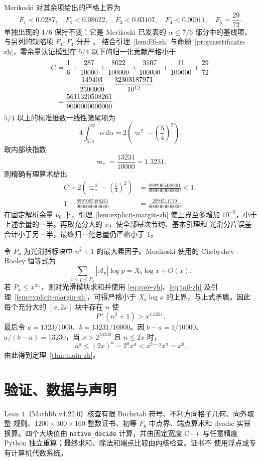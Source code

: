 \documentclass[UTF8,10pt,a4paper]{ctexart}
\newcommand{\Pplus}{P^{+}}
\newcommand{\Acal}{\mathcal{A}}
\newcommand{\1}{\mathbf{1}}
\theoremstyle{remark}
\begin{document}
Merikoski 对其余项给出的严格上界为
\[
 F_1<0.0287,\quad F_2<0.08622,\quad F_3<0.03107,\quad
 F_4<0.00011,\quad F_5=\frac{29}{72}.
\]
单独出现的 $1/6$ 保持不变：它是 Merikoski 已发表的
$\alpha\le7/6$ 部分中的基线项，与另列的缺陷项 $F_1$--$F_4$ 分开
\cite[Section 2.6，定理 2 的证明]{Merikoski2020}。
结合引理~\ref{lem:F6-zh} 与命题~\ref{prop:certificate-zh}，零余量认证模型在
$5/4$ 以下的归一化贡献严格小于
\begin{align}\label{eq:core-zh}
 C&=\frac16+\frac{287}{10000}+\frac{8622}{100000}
 +\frac{3107}{100000}+\frac{11}{100000}+\frac{29}{72}\notag\\
 &\qquad-\frac{149403}{2500000}
 -\frac{32303187971}{10^{12}}\notag\\
 &=\frac{5611320508261}{9000000000000}.
\end{align}
$5/4$ 以上的标准维数一线性筛尾项为
\begin{equation}\label{eq:tail-zh}
 4\int_{5/4}^{\varpi}\alpha\,d\alpha
 =2\left(\varpi^2-\left(\frac54\right)^2\right).
\end{equation}
取内部块指数
\[
 \varpi_*=\frac{13231}{10000}=1.3231.
\]
则精确有理算术给出
\begin{align}\label{eq:budget-zh}
 C+2\left(\varpi_*^2-\left(\frac54\right)^2\right)
 &=\frac{8997005488261}{9000000000000}<1,\\
1-\frac{8997005488261}{9000000000000}
&=\frac{2994511739}{9000000000000}.
\end{align}
在固定解析余量 $\nu_0$ 下，引理~\ref{lem:explicit-margin-zh} 使上界至多增加
$10^{-9}$，小于上述余量的一半。再取充分大的 $x$，使全部幂次节约、基本引理和
光滑分片误差合计小于另一半，最终归一化总量仍严格小于 $1$。

令 $P_x$ 为光滑指标块中 $n^2+1$ 的最大素因子。Merikoski 使用的
Chebyshev--Hooley 恒等式为
\[
 \sum_{x<p\le P_x}|\Acal_p|\log p=X_b\log x+O(x).
\]
若 $P_x\le x^{\varpi_*}$，则对光滑模块求和并使用
\eqref{eq:core-zh}、\eqref{eq:tail-zh} 及引理~\ref{lem:explicit-margin-zh}，可得严格小于
$X_b\log x$ 的上界，与上式矛盾。因此每个充分大的 $[x,2x]$ 块中存在
$n$ 使
\[
 \Pplus(n^2+1)>x^{1.3231}.
\]
最后令 $a=1323/1000$、$b=13231/10000$。因
$b-a=1/10000$、$a/(b-a)=13230$，当 $x>2^{13230}$ 且 $n\le2x$ 时，
\[
 n^a\le(2x)^a=2^ax^a<x^{b-a}x^a=x^b.
\]
由此得到定理~\ref{thm:main-zh}。

\section{验证、数据与声明}

Lean 4（Mathlib v4.22.0）核查有限 Buchstab 符号、不利方向格子几何、向外取整
规则、$1200\times300\times160$ 整数证书、初等 $F_6$ 中点界、端点算术和
dyadic 实幂换算。四个大块值由 \texttt{native\_decide} 计算，并由固定宽度
C++ 与任意精度 Python 独立重算；最终求和、除法和端点比较由内核检查。证书不
使用浮点或专有计算机代数系统。
\end{document}
